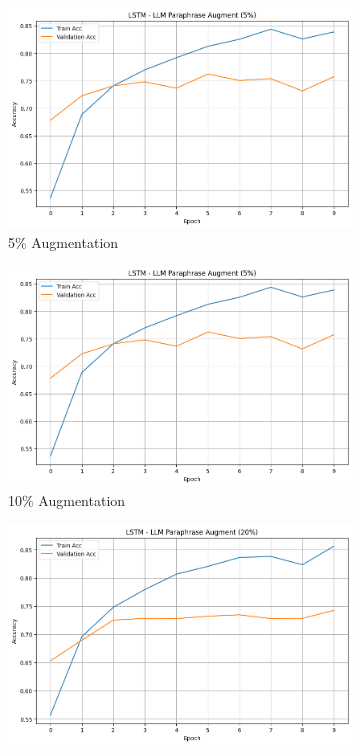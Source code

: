 \documentclass{article}
\begin{document}
\begin{figure}[ht]
  \centering
  \begin{subfigure}[b]{0.3\textwidth}
    \includegraphics[width=\textwidth]{img/llm_5_lstm.png}
    \caption{5\% Augmentation}
    \label{fig:llm_5_lstm}
  \end{subfigure}
  \hfill
  \begin{subfigure}[b]{0.3\textwidth}
    \includegraphics[width=\textwidth]{img/llm_10_lstm.png}
    \caption{10\% Augmentation}
    \label{fig:llm_10_lstm}
  \end{subfigure}
  \hfill
  \begin{subfigure}[b]{0.3\textwidth}
    \includegraphics[width=\textwidth]{img/llm_20_lstm.png}

\end{subfigure}
\end{figure}
\end{document}
